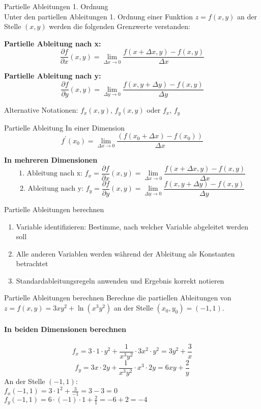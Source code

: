 \begin{definition}{Partielle Ableitungen 1. Ordnung}\\
Unter den partiellen Ableitungen 1. Ordnung einer Funktion $z = f(x,y)$ an der Stelle $(x,y)$ werden die folgenden Grenzwerte verstanden:

\textbf{Partielle Ableitung nach x:}
$$\frac{\partial f}{\partial x}(x,y) = \lim_{\Delta x \rightarrow 0} \frac{f(x + \Delta x, y) - f(x,y)}{\Delta x}$$

\textbf{Partielle Ableitung nach y:}
$$\frac{\partial f}{\partial y}(x,y) = \lim_{\Delta y \rightarrow 0} \frac{f(x, y + \Delta y) - f(x,y)}{\Delta y}$$

Alternative Notationen: $f_x(x,y)$, $f_y(x,y)$ oder $f_x$, $f_y$
\end{definition}

\begin{theorem}{Partielle Ableitung}
In einer Dimension
$$
f^{\prime}\left(x_0\right)=\lim _{\Delta x \rightarrow 0} \frac{\left(f\left(x_0+\Delta x\right)-f\left(x_0\right)\right)}{\Delta x}
$$

\textcolor{frog}{\textbf{In mehreren Dimensionen}}
$$\text{1. Ableitung nach x: } f_x=\frac{\partial f}{\partial x}(x, y)=\lim _{\Delta x \rightarrow 0} \frac{f(x+\Delta x, y)-f(x, y)}{\Delta x}$$
$$\text{2. Ableitung nach y: } f_y=\frac{\partial f}{\partial y}(x, y)=\lim _{\Delta y \rightarrow 0} \frac{f(x, y+\Delta y)-f(x, y)}{\Delta y}$$
\end{theorem}



\begin{KR}{Partielle Ableitungen berechnen}
    \begin{enumerate}
        \item Variable identifizieren: Bestimme, nach welcher Variable abgeleitet werden soll
        \item Alle anderen Variablen werden während der Ableitung als Konstanten betrachtet
        \item Standardableitungsregeln anwenden und Ergebnis korrekt notieren
    \end{enumerate}
\end{KR}

\begin{example2}{Partielle Ableitungen berechnen}
Berechne die partiellen Ableitungen von $z = f(x,y) = 3xy^2 + \ln(x^3 y^2)$ an der Stelle $(x_0, y_0) = (-1, 1)$.
\paragraph{In beiden Dimensionen berechnen}
$$f_x = 3 \cdot 1 \cdot y^2 + \frac{1}{x^3 y^2} \cdot 3x^2 \cdot y^2 = 3y^2 + \frac{3}{x}$$
$$f_y = 3x \cdot 2y + \frac{1}{x^3 y^2} \cdot x^3 \cdot 2y = 6xy + \frac{2}{y}$$
An der Stelle $(-1, 1)$:\\
$f_x(-1, 1) = 3 \cdot 1^2 + \frac{3}{-1} = 3 - 3 = 0$\\
$f_y(-1, 1) = 6 \cdot (-1) \cdot 1 + \frac{2}{1} = -6 + 2 = -4$
\end{example2}

